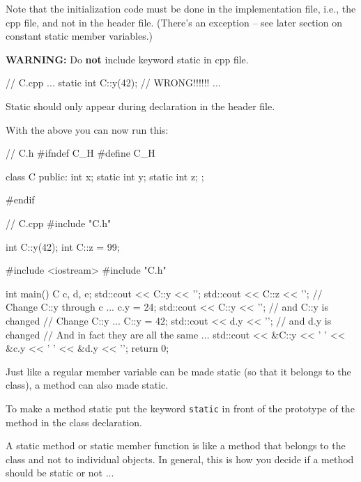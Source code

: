 Note that the initialization code must be done in the implementation
file, i.e., the cpp file, and not in the header file.
(There's an exception -- see later section on constant
static member variables.)

\textbf{WARNING:} Do \textbf{not} include keyword static in cpp file.

\begin{consolethree}[escapeinside=||]
// C.cpp
...
static int C::y(42); // WRONG!!!!!!
...
\end{consolethree}

Static should only appear during declaration in the header file.

With the above you can now run this:

\begin{consolethree}[escapeinside=||]
// C.h
#ifndef C_H
#define C_H

class C
{
public:
    int x;
    static int y;
    static int z;
};

#endif
\end{consolethree}

\begin{consolethree}[escapeinside=||]
// C.cpp
#include "C.h"

int C::y(42);
int C::z = 99;
\end{consolethree}

\begin{consolethree}[escapeinside=||]
#include <iostream>
#include "C.h"

int main()
{
    C c, d, e;
    std::cout << C::y << '\n';
    std::cout << C::z << '\n';
    // Change C::y through c ...
    c.y = 24;
    std::cout << C::y << '\n'; // and C::y is changed
    // Change C::y ...
    C::y = 42;
    std::cout << d.y << '\n'; // and d.y is changed
    // And in fact they are all the same ...
    std::cout << &C::y << ' '
              << &c.y << ' '
              << &d.y << '\n';
    return 0;
}
\end{consolethree}


\newpage{}

Just like a regular member variable can be made static (so that it
belongs to the class), a method can also made static.

To make a method static put the keyword \texttt{static} in front of the
prototype of the method in the class declaration.

A static method or static member function is like a method that belongs
to the class and not to individual objects. In general, this is how you
decide if a method should be static or not ...

